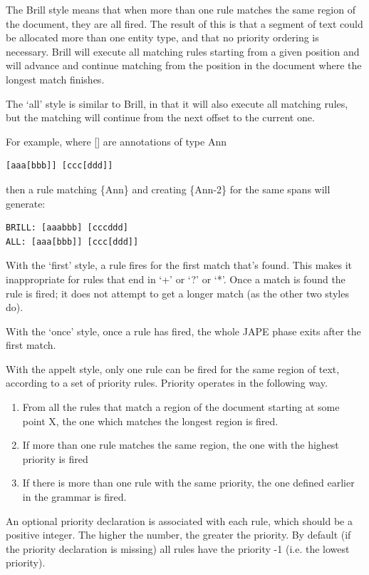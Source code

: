 The Brill style means that when more than one rule matches the same region of
the document, they are all fired. The result of this is that a segment of text
could be allocated more than one entity type, and that no priority ordering is
necessary. Brill will execute all matching rules starting from a given position
and will advance and continue matching from the position in the document where
the longest match finishes.

The `all' style is similar to Brill, in that it will also execute all matching
rules, but the matching will continue from the next offset to the current one.

For example, where [] are annotations of type Ann
\begin{small}
\begin{verbatim}
[aaa[bbb]] [ccc[ddd]]
\end{verbatim}
\end{small}
then a rule matching \{Ann\} and creating \{Ann-2\} for the same spans will generate:
\begin{small}
\begin{verbatim}
BRILL: [aaabbb] [cccddd]
ALL: [aaa[bbb]] [ccc[ddd]]
\end{verbatim}
\end{small}

With the `first' style, a rule fires for the first match that's
found. This makes it inappropriate for rules that end in `+' or `?' or
`*'. Once a match is found the rule is fired; it does not attempt to
get a longer match (as the other two styles do).

With the `once' style, once a rule has fired, the whole JAPE phase exits after
the first match.

With the appelt style, only one rule can be fired for the same region
of text, according to a set of priority rules. Priority operates in the
following way.
%
\begin{enumerate}
\item  From all the rules that match a region of the document starting at some
point X, the one which matches the longest region is fired.
\item If more than one rule matches the same region, the one with
the highest priority is fired
\item If there is more than one rule with the same priority, the one
defined earlier in the grammar is fired.
%
\end{enumerate}

An optional priority declaration is associated with each rule, which should
be a positive integer. The higher the number, the greater the priority.
By default (if the priority declaration is missing) all rules have the
priority -1 (i.e. the lowest priority).

